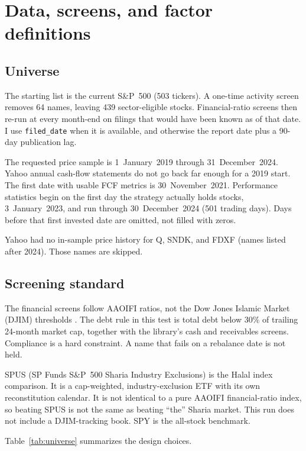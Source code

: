 \documentclass[11pt,letterpaper]{article}
\begin{document}
\section{Data, screens, and factor definitions}
\label{sec:data}

\subsection{Universe}

The starting list is the current S\&P~500 (503 tickers). A one-time activity screen removes 64 names, leaving 439 sector-eligible stocks. Financial-ratio screens then re-run at every month-end on filings that would have been known as of that date. I use \texttt{filed\_date} when it is available, and otherwise the report date plus a 90-day publication lag.

The requested price sample is 1~January~2019 through 31~December~2024. Yahoo annual cash-flow statements do not go back far enough for a 2019 start. The first date with usable FCF metrics is 30~November~2021. Performance statistics begin on the first day the strategy actually holds stocks, 3~January~2023, and run through 30~December~2024 (501 trading days). Days before that first invested date are omitted, not filled with zeros.

Yahoo had no in-sample price history for Q, SNDK, and FDXF (names listed after 2024). Those names are skipped.

\subsection{Screening standard}

The financial screens follow AAOIFI ratios, not the Dow Jones Islamic Market (DJIM) thresholds \citep{aaoifi21,derigs2008}. The debt rule in this test is total debt below 30\% of trailing 24-month market cap, together with the library's cash and receivables screens. Compliance is a hard constraint. A name that fails on a rebalance date is not held.

SPUS (SP Funds S\&P~500 Sharia Industry Exclusions) is the Halal index comparison. It is a cap-weighted, industry-exclusion ETF with its own reconstitution calendar. It is not identical to a pure AAOIFI financial-ratio index, so beating SPUS is not the same as beating ``the'' Sharia market. This run does not include a DJIM-tracking book. SPY is the all-stock benchmark.

Table~\ref{tab:universe} summarizes the design choices.
\end{document}
